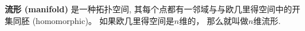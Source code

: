 

\textbf{流形 (manifold)} 是一种拓扑空间, 其每个点都有一邻域与与欧几里得空间中的开集同胚 (homomorphic)。 如果欧几里得空间是$n$维的， 那么就叫做$n$维流形. 
